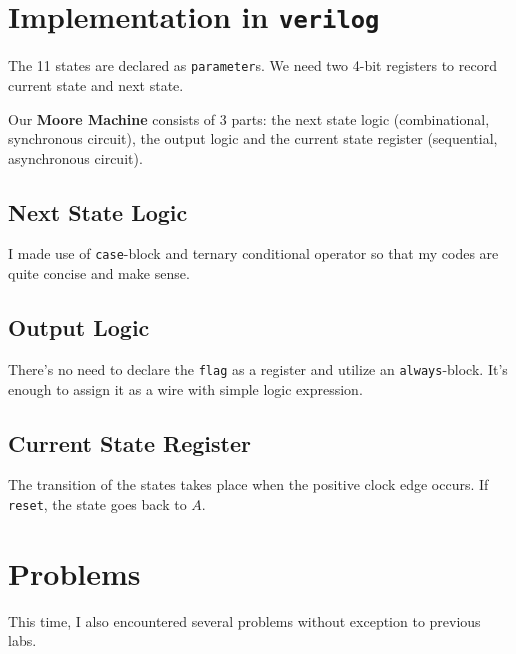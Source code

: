 \documentclass[12pt, a4paper]{article}
\begin{document}
\section{Implementation in \texttt{verilog}}

The 11 states are declared as \texttt{parameter}s. We need two 4-bit registers to record current state and next state.


Our \textbf{Moore Machine} consists of 3 parts: the next state logic (combinational, synchronous circuit), the output logic and the current state register (sequential, asynchronous circuit).

\subsection{Next State Logic}

I made use of \texttt{case}-block and ternary conditional operator so that my codes are quite concise and make sense.



\subsection{Output Logic}

There's no need to declare the \texttt{flag} as a register and utilize an \texttt{always}-block. It's enough to assign it as a wire with simple logic expression.



\subsection{Current State Register}

The transition of the states takes place when the positive clock edge occurs. If \texttt{reset}, the state goes back to $A$.



\section{Problems}

This time, I also encountered several problems without exception to previous labs.
\end{document}
